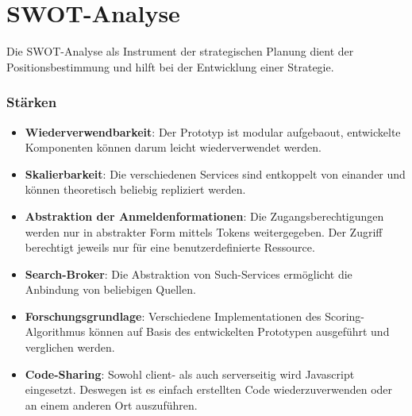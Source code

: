 
\section{SWOT-Analyse}

Die SWOT-Analyse als Instrument der strategischen Planung dient der Positionsbestimmung und hilft bei der Entwicklung einer Strategie.

\subsubsection{Stärken}

\begin{itemize}
    \item \textbf{Wiederverwendbarkeit}: Der Prototyp ist modular aufgebaout, entwickelte Komponenten können darum leicht wiederverwendet werden.
    \item \textbf{Skalierbarkeit}: Die verschiedenen Services sind entkoppelt von einander und können theoretisch beliebig repliziert werden.
    \item \textbf{Abstraktion der Anmeldenformationen}: Die Zugangsberechtigungen werden nur in abstrakter Form mittels Tokens weitergegeben. Der Zugriff berechtigt jeweils nur für eine benutzerdefinierte Ressource.
    \item \textbf{Search-Broker}: Die Abstraktion von Such-Services ermöglicht die Anbindung von beliebigen Quellen.
    \item \textbf{Forschungsgrundlage}: Verschiedene Implementationen des Sco\-ring-Algorithmus können auf Basis des entwickelten Prototypen ausgeführt und verglichen werden.
    \item \textbf{Code-Sharing}: Sowohl client- als auch serverseitig wird Javascript eingesetzt. Deswegen ist es einfach erstellten Code wiederzuverwenden oder an einem anderen Ort auszuführen.
\end{itemize}

